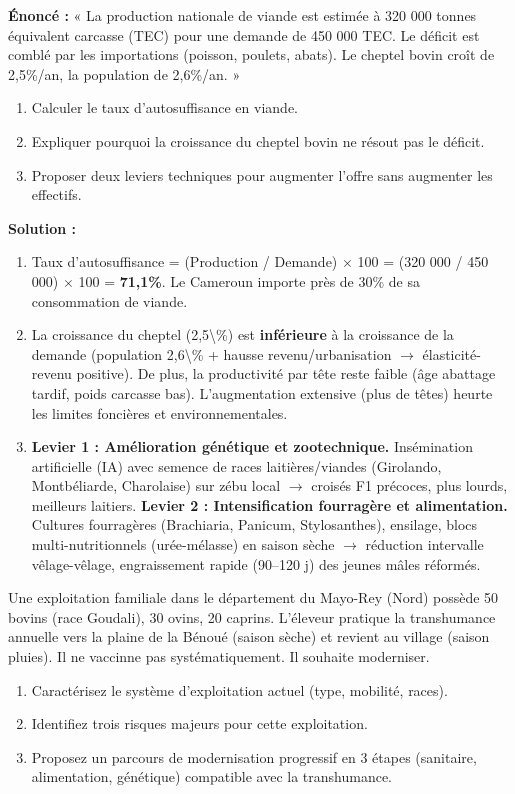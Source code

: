 \documentclass[11pt]{article}
\begin{document}
\begin{exoresolu}
\textbf{Énoncé :} « La production nationale de viande est estimée à 320 000 tonnes équivalent carcasse (TEC) pour une demande de 450 000 TEC. Le déficit est comblé par les importations (poisson, poulets, abats). Le cheptel bovin croît de 2,5\%/an, la population de 2,6\%/an. »
\begin{enumerate}
    \item Calculer le taux d'autosuffisance en viande.
    \item Expliquer pourquoi la croissance du cheptel bovin ne résout pas le déficit.
    \item Proposer deux leviers techniques pour augmenter l'offre sans augmenter les effectifs.
\end{enumerate}
\tcblower
\textbf{Solution :}
\begin{enumerate}
    \item Taux d'autosuffisance = (Production / Demande) $\times$ 100 = (320 000 / 450 000) $\times$ 100 = \textbf{71,1\%}. Le Cameroun importe près de 30\% de sa consommation de viande.
    \item La croissance du cheptel (\num{2,5\%}) est \textbf{inférieure} à la croissance de la demande (population \num{2,6\%} + hausse revenu/urbanisation $\rightarrow$ élasticité-revenu positive). De plus, la productivité par tête reste faible (âge abattage tardif, poids carcasse bas). L'augmentation extensive (plus de têtes) heurte les limites foncières et environnementales.
    \item \textbf{Levier 1 : Amélioration génétique et zootechnique.} Insémination artificielle (IA) avec semence de races laitières/viandes (Girolando, Montbéliarde, Charolaise) sur zébu local $\rightarrow$ croisés F1 précoces, plus lourds, meilleurs laitiers. \textbf{Levier 2 : Intensification fourragère et alimentation.} Cultures fourragères (Brachiaria, Panicum, Stylosanthes), ensilage, blocs multi-nutritionnels (urée-mélasse) en saison sèche $\rightarrow$ réduction intervalle vêlage-vêlage, engraissement rapide (90--120 j) des jeunes mâles réformés.
\end{enumerate}
\end{exoresolu}

\begin{exercice}
Une exploitation familiale dans le département du Mayo-Rey (Nord) possède 50 bovins (race Goudali), 30 ovins, 20 caprins. L'éleveur pratique la transhumance annuelle vers la plaine de la Bénoué (saison sèche) et revient au village (saison pluies). Il ne vaccinne pas systématiquement. Il souhaite moderniser.
\begin{enumerate}
    \item Caractérisez le système d'exploitation actuel (type, mobilité, races).
    \item Identifiez trois risques majeurs pour cette exploitation.
    \item Proposez un parcours de modernisation progressif en 3 étapes (sanitaire, alimentation, génétique) compatible avec la transhumance.
\end{enumerate}
\end{exercice}
\end{document}
